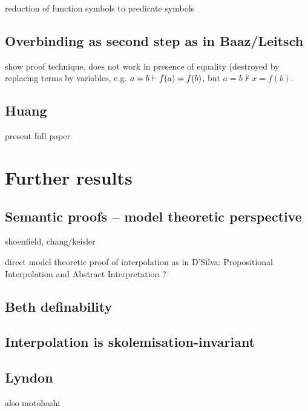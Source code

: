 \documentclass[,%
			paper=a4,%
			DIV12,
			liststotoc,
			bibtotoc,
			draft=false,%
			numbers=noendperiod
			]{scrartcl}
\theoremstyle{definition}
\begin{document}
	 reduction of function symbols to predicate symbols 

	\subsection{Overbinding as second step as in Baaz/Leitsch}
		show proof technique, does not work in presence of equality (destroyed by replacing terms by variables, e.g. $ a=b \vdash f(a) = f(b) $, but $ a=b \nvdash x = f(b)$.
	
	\subsection{Huang}
		present full paper
		

\section{Further results}
	\subsection{Semantic proofs -- model theoretic perspective}
		shoenfield, chang/keisler

		direct model theoretic proof of interpolation as in D'Silva: Propositional Interpolation and Abstract Interpretation ?


	\subsection{Beth definability}

	\subsection{Interpolation is skolemisation-invariant}

	\subsection{Lyndon}
	also motohashi
\end{document}
